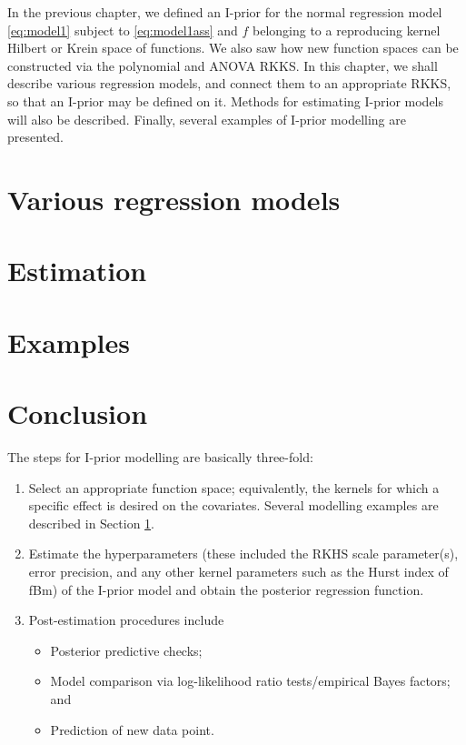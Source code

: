 \documentclass[a4paper,showframe,11pt]{report}
\begin{document}

In the previous chapter, we defined an I-prior for the normal regression model \eqref{eq:model1} subject to \eqref{eq:model1ass} and $f$ belonging to a reproducing kernel Hilbert or Krein space of functions.
We also saw how new function spaces can be constructed via the polynomial and ANOVA RKKS.
In this chapter, we shall describe various regression models, and connect them to an appropriate RKKS, so that an I-prior may be defined on it.
Methods for estimating I-prior models will also be described.
Finally, several examples of I-prior modelling are presented.

\section{Various regression models}\label{sec:various-regression}


\section{Estimation}
%

\section{Examples}
%

\section{Conclusion}

The steps for I-prior modelling are basically three-fold:
\begin{enumerate}
  \item Select an appropriate function space; equivalently, the kernels for which a specific effect is desired on the covariates. Several modelling examples are described in Section \ref{sec:various-regression}.
  \item Estimate the hyperparameters (these included the RKHS scale parameter(s), error precision, and any other kernel parameters such as the Hurst index of fBm) of the I-prior model and obtain the posterior regression function.
  \item Post-estimation procedures include
  \begin{itemize}
    \item Posterior predictive checks;
    \item Model comparison via log-likelihood ratio tests/empirical Bayes factors; and
    \item Prediction of new data point.
  \end{itemize}
\end{enumerate}
\end{document}
